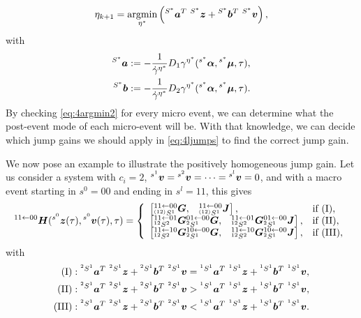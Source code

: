 \documentclass[../DC2017114Bouma.tex]{subfiles}
\begin{document}
\begin{align}
\eta_{k+1} = \underset{\eta^*}{\argmin}\left(\ls^{S^\ast}\ab^T\ \ls^{S^\ast}\zb +\ls^{S^\ast}\bb^T\ \ls^{S^\ast}\vb\right),
\end{align}
with
\begin{align*}
\hspace{0cm}^{S^\ast}{\boldsymbol{a}} &:= -\frac{1}{\dot{\gamma}^{\eta^\ast}}D_1\gamma^{\eta^\ast}(\hspace{0cm}^{s^\ast}\boldsymbol{\alpha},\hspace{0cm}^{s^\ast}\boldsymbol{\mu},\tau),\\
\hspace{0cm}^{S^\ast}{\boldsymbol{b}} &:= -\frac{1}{\dot{\gamma}^{\eta^\ast}}D_2\gamma^{\eta^\ast}(\hspace{0cm}^{s^\ast}\boldsymbol{\alpha},\hspace{0cm}^{s^\ast}\boldsymbol{\mu},\tau).
\end{align*}
By checking \eqref{eq:4argmin2} for every micro event, we can determine what the post-event mode of each micro-event will be. With that knowledge, we can decide which jump gains we should apply in \eqref{eq:4ljumps} to find the correct jump gain.

We now pose an example to illustrate the positively homogeneous jump gain. Let us consider a system with $c_i = 2$, $\hspace{0cm}^{s^1}{\boldsymbol{v}}=\hspace{0cm}^{s^2}{\boldsymbol{v}}=\dots=\hspace{0cm}^{s^l}{\boldsymbol{v}}=0$, and with a macro event starting in $s^0 = 00$ and ending in $s^l = 11$, this gives 
\begin{align}
\hspace{0cm}^{11\leftarrow 00}{\boldsymbol{H}}(\hspace{0cm}^{s^0}{\boldsymbol{z}}(\tau),\hspace{0cm}^{s^0}{\boldsymbol{v}}(\tau),\tau) = \left\lbrace\begin{array}{ll}
\begin{bmatrix}\hspace{0cm}^{11\leftarrow 00}_{\hspace{0cm}^{(12)}S^1}{\boldsymbol{G}}, & \hspace{0cm}^{11\leftarrow 00}_{\hspace{0cm}^{(12)}S^1}{\boldsymbol{J}}\end{bmatrix}, & \text{if }(\text{I}),\\
\begin{bmatrix}\hspace{0cm}^{11\leftarrow 01}_{\hspace{0cm}^{12}S^2}{\boldsymbol{G}} \hspace{0cm}^{01\leftarrow 00}_{\hspace{0cm}^{2}S^1}{\boldsymbol{G}}, & \hspace{0cm}^{11\leftarrow 01}_{\hspace{0cm}^{12}S^2}{\boldsymbol{G}} \hspace{0cm}^{01\leftarrow 00}_{\hspace{0cm}^{2}S^1}{\boldsymbol{J}}\end{bmatrix}, & \text{if }(\text{II}),\\
\begin{bmatrix}\hspace{0cm}^{11\leftarrow 10}_{\hspace{0cm}^{12}S^2}{\boldsymbol{G}} \hspace{0cm}^{10\leftarrow 00}_{\hspace{0cm}^{2}S^1}{\boldsymbol{G}}, & \hspace{0cm}^{11\leftarrow 10}_{\hspace{0cm}^{12}S^2}{\boldsymbol{G}} \hspace{0cm}^{10\leftarrow 00}_{\hspace{0cm}^{2}S^1}{\boldsymbol{J}}\end{bmatrix}, & \text{if }(\text{III}),
\end{array}\right.\label{eq:4H2200}
\end{align}
with
\begin{align}
(\text{I})&:\ls^{^2 S^1}\ab^T\ \ls^{^2 S^1}\zb +\ls^{^2 S^1}\bb^T\ \ls^{^2 S^1}\vb = \ls^{^1 S^1}\ab^T\ \ls^{^1 S^1}\zb +\ls^{^1 S^1}\bb^T\ \ls^{^1 S^1}\vb,\nonumber\\
(\text{II})&:\ls^{^2 S^1}\ab^T\ \ls^{^2 S^1}\zb +\ls^{^2 S^1}\bb^T\ \ls^{^2 S^1}\vb > \ls^{^1 S^1}\ab^T\ \ls^{^1 S^1}\zb +\ls^{^1 S^1}\bb^T\ \ls^{^1 S^1}\vb,\label{eq:4conds}\\
(\text{III})&:\ls^{^2 S^1}\ab^T\ \ls^{^2 S^1}\zb +\ls^{^2 S^1}\bb^T\ \ls^{^2 S^1}\vb < \ls^{^1 S^1}\ab^T\ \ls^{^1 S^1}\zb +\ls^{^1 S^1}\bb^T\ \ls^{^1 S^1}\vb.\nonumber
\end{align}
\end{document}
